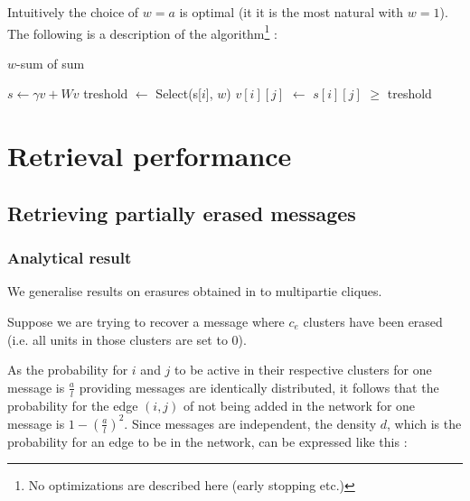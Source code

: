 \documentclass[english,11pt,twocolumn]{article}
\renewcommand{\ge}{\geqslant}
\newcommand*\Let[2]{\State #1 $\gets$ #2}
\theoremstyle{definition}
\begin{document}
		Intuitively the choice of $w = a$ is optimal (it it is the most natural with $w = 1$).
		The following is a description of the algorithm\footnote{No optimizations are described here (early stopping etc.)} :
		\begin{algorithm}
		\caption{$w$-sum of sum \label{asumsum}}
		\begin{algorithmic}[1]
		\State $s \gets \gamma v + W v$
			\Let{treshold}{Select(s[$i$], $w$)} 
			\Let{$v[i][j]$}{$s[i][j]$ $\ge$ treshold}
			\EndFor
		\EndFor
		\EndFor
		\EndProcedure
		\end{algorithmic}
		\end{algorithm}

	\section{Retrieval performance}	
	

	\subsection{Retrieving partially erased messages}		
		
	\subsubsection{Analytical result}
		
	
	
	
	
	
	
	We generalise results on erasures obtained in \cite{GriBer20117} to multipartie cliques.
	
	Suppose we are trying to recover a message where $c_e$ clusters have been erased (i.e. all units in those clusters are set to $0$).
	
	As the probability for $i$ and $j$ to be active in their respective clusters for one message is $\frac{a}{l}$ providing messages are identically distributed, it follows that the probability for the edge $(i,j)$ of not being added in the network for one message is $1 - \left(\frac{a}{l}\right)^2$. Since messages are independent, the density $d$, which is the probability for an edge to be in the network, can be expressed like this :
	
\end{document}
